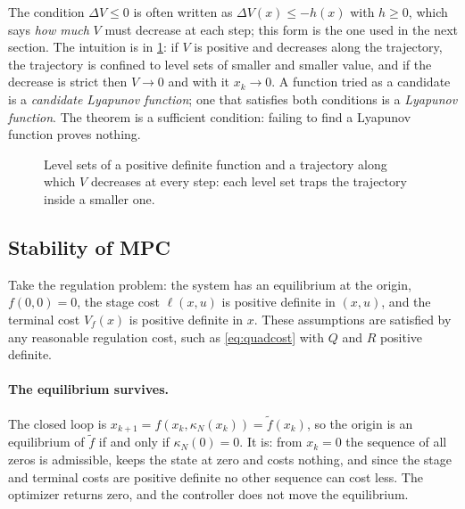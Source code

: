 The condition $\Delta V \le 0$ is often written as $\Delta V(x) \le -h(x)$ with $h \ge 0$,
which says \emph{how much} $V$ must decrease at each step; this form is the one used in the
next section. The intuition is in \cref{fig:lyapunov}: if $V$ is positive and decreases along
the trajectory, the trajectory is confined to level sets of smaller and smaller value, and if
the decrease is strict then $V \to 0$ and with it $x_k \to 0$. A function tried as a candidate is
a \emph{candidate Lyapunov function}; one that satisfies both conditions is a \emph{Lyapunov
function}. The theorem is a sufficient condition: failing to find a Lyapunov function proves
nothing.

\begin{figure}[t]
\centering
{}
\caption{Level sets of a positive definite function and a trajectory along which $V$ decreases
at every step: each level set traps the trajectory inside a smaller one.}
\label{fig:lyapunov}
\end{figure}

\subsection{Stability of MPC}

Take the regulation problem: the system has an equilibrium at the origin, $f(0,0) = 0$, the
stage cost $\ell(x,u)$ is positive definite in $(x,u)$, and the terminal cost $V_f(x)$ is
positive definite in $x$. These assumptions are satisfied by any reasonable regulation cost,
such as \eqref{eq:quadcost} with $Q$ and $R$ positive definite.

\paragraph{The equilibrium survives.} The closed loop is $x_{k+1} = f(x_k, \kappa_N(x_k)) =
\tilde f(x_k)$, so the origin is an equilibrium of $\tilde f$ if and only if $\kappa_N(0) = 0$. It
is: from $x_k = 0$ the sequence of all zeros is admissible, keeps the state at zero and costs
nothing, and since the stage and terminal costs are positive definite no other sequence can
cost less. The optimizer returns zero, and the controller does not move the equilibrium.

